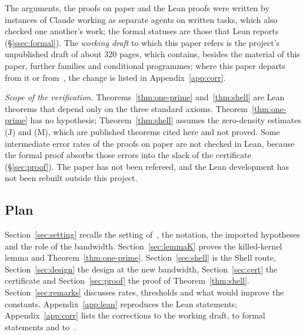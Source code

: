 The arguments, the proofs on paper and the Lean proofs were written by instances of Claude working as separate agents on written tasks, which also
checked one another's work; the formal statuses are those that Lean reports (\S\ref{ssec:formal}). The \emph{working draft} to which this paper refers
is the project's unpublished draft of about $320$ pages, which contains, besides the material of this paper, further families and conditional
programmes; where this paper departs from it or from~\cite{DSouza}, the change is listed in Appendix~\ref{app:corr}.

\emph{Scope of the verification.} Theorems~\ref{thm:one-prime} and~\ref{thm:shell} are Lean theorems that depend only on the three standard
axioms. Theorem~\ref{thm:one-prime} has no hypothesis; Theorem~\ref{thm:shell} assumes the zero-density estimates \textup{(J)} and
\textup{(M)}, which are published theorems cited here and not proved. Some intermediate error rates of the proofs on paper are not checked in
Lean, because the formal proof absorbs those errors into the slack of the certificate (\S\ref{sec:proof}). The paper has not been refereed,
and the Lean development has not been rebuilt outside this project.

\subsection{Plan}
Section~\ref{sec:setting} recalls the setting of~\cite{DSouza}, the notation, the imported hypotheses and the role of the bandwidth.
Section~\ref{sec:lemmaK} proves the killed-kernel lemma and Theorem~\ref{thm:one-prime}. Section~\ref{sec:shell} is the Shell route,
Section~\ref{sec:design} the design at the new bandwidth, Section~\ref{sec:cert} the certificate and Section~\ref{sec:proof} the proof of
Theorem~\ref{thm:shell}. Section~\ref{sec:remarks} discusses rates, thresholds and what would improve the constants. Appendix~\ref{app:lean} reproduces
the Lean statements; Appendix~\ref{app:corr} lists the corrections to the working draft, to formal statements and to~\cite{DSouza}.

